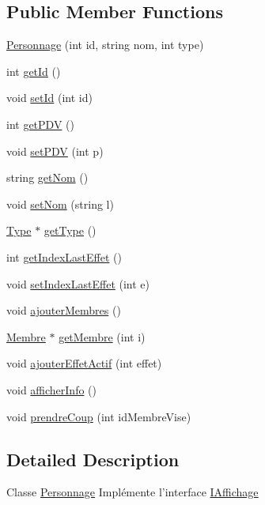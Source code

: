 \subsection*{\-Public \-Member \-Functions}
\begin{DoxyCompactItemize}
\item 
\hyperlink{class_personnage_a962f03c014911e25449829891f1e2d15}{\-Personnage} (int id, string nom, int type)
\item 
int \hyperlink{class_personnage_a24fbf035171564c8cb2abff10642d73c}{get\-Id} ()
\item 
void \hyperlink{class_personnage_a5eaaea57f901cf1f04c1ee4752f03007}{set\-Id} (int id)
\item 
int \hyperlink{class_personnage_a8e5dab03a028a1c04b692f737c495979}{get\-P\-D\-V} ()
\item 
void \hyperlink{class_personnage_ada4855cf75754881b579a3a84aba2f47}{set\-P\-D\-V} (int p)
\item 
string \hyperlink{class_personnage_a519301399a9bee1557858aa50a04a85a}{get\-Nom} ()
\item 
void \hyperlink{class_personnage_a73b26b1b2f225f10fba5e1c294f47f8a}{set\-Nom} (string l)
\item 
\hyperlink{class_type}{\-Type} $\ast$ \hyperlink{class_personnage_adc6cc2d57410d41817814775eae0fc7b}{get\-Type} ()
\item 
int \hyperlink{class_personnage_aab567206193ab8e53a6ab8a1a972123f}{get\-Index\-Last\-Effet} ()
\item 
void \hyperlink{class_personnage_a11d434b9150ee0bd6487f34b6afbdf44}{set\-Index\-Last\-Effet} (int e)
\item 
void \hyperlink{class_personnage_a30747012401c2f14d40cbf70da549a50}{ajouter\-Membres} ()
\item 
\hyperlink{class_membre}{\-Membre} $\ast$ \hyperlink{class_personnage_a846d7adbcb9d200c2e2a725afc3b5eb5}{get\-Membre} (int i)
\item 
void \hyperlink{class_personnage_a8025dcfd3f7c0284aae99527267e13c9}{ajouter\-Effet\-Actif} (int effet)
\item 
void \hyperlink{class_personnage_a79ce4d8f13bc64471c553a32f2bb0e2d}{afficher\-Info} ()
\item 
void \hyperlink{class_personnage_ab6d8d089b1e19738e898cf5b346e0bb6}{prendre\-Coup} (int id\-Membre\-Vise)
\end{DoxyCompactItemize}


\subsection{\-Detailed \-Description}
\-Classe \hyperlink{class_personnage}{\-Personnage} \-Implémente l'interface \hyperlink{class_i_affichage}{\-I\-Affichage} 

